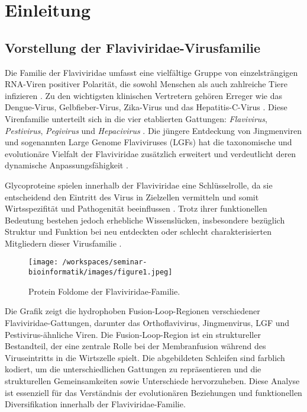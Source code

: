 \chapter{Einleitung} \label{chap:einleitung}

\section{Vorstellung der Flaviviridae-Virusfamilie}
\label{sec:vorstellung-der-flaviviridae-virusfamilie}

Die Familie der Flaviviridae umfasst eine vielfältige Gruppe von einzelsträngigen RNA-Viren positiver Polarität, die sowohl Menschen als auch zahlreiche Tiere infizieren \autocite{Simmonds2017}. Zu den wichtigsten klinischen Vertretern gehören Erreger wie das Dengue-Virus, Gelbfieber-Virus, Zika-Virus und das Hepatitis-C-Virus \autocite{Mackenzie2004}. Diese Virenfamilie unterteilt sich in die vier etablierten Gattungen: \textit{Flavivirus}, \textit{Pestivirus}, \textit{Pegivirus} und \textit{Hepacivirus} \autocite{Simmonds2017}. Die jüngere Entdeckung von Jingmenviren und sogenannten Large Genome Flaviviruses (LGFs) hat die taxonomische und evolutionäre Vielfalt der Flaviviridae zusätzlich erweitert und verdeutlicht deren dynamische Anpassungsfähigkeit \autocite{shiDivergentVirusesDiscovered2015}.

Glycoproteine spielen innerhalb der Flaviviridae eine Schlüsselrolle, da sie entscheidend den Eintritt des Virus in Zielzellen vermitteln und somit Wirtsspezifität und Pathogenität beeinflussen \autocite{Mukhopadhyay2005}. Trotz ihrer funktionellen Bedeutung bestehen jedoch erhebliche Wissenslücken, insbesondere bezüglich Struktur und Funktion bei neu entdeckten oder schlecht charakterisierten Mitgliedern dieser Virusfamilie \autocite{mifsudMappingGlycoproteinStructure2024}.

\begin{figure}[H]
    \centering
    \texttt{[image: /workspaces/seminar-bioinformatik/images/figure1.jpeg]}
    \caption{Protein Foldome der Flaviviridae-Familie.}
    \label{fig:figure1-orginal}
\end{figure}

Die Grafik zeigt die hydrophoben Fusion-Loop-Regionen verschiedener Flaviviridae-Gattungen, darunter das Orthoflavivirus, Jingmenvirus, LGF und Pestivirus-ähnliche Viren. Die Fusion-Loop-Region ist ein struktureller Bestandteil, der eine zentrale Rolle bei der Membranfusion während des Viruseintritts in die Wirtszelle spielt. Die abgebildeten Schleifen sind farblich kodiert, um die unterschiedlichen Gattungen zu repräsentieren und die strukturellen Gemeinsamkeiten sowie Unterschiede hervorzuheben. Diese Analyse ist essenziell für das Verständnis der evolutionären Beziehungen und funktionellen Diversifikation innerhalb der Flaviviridae-Familie. \autocite{mifsudMappingGlycoproteinStructure2024}

